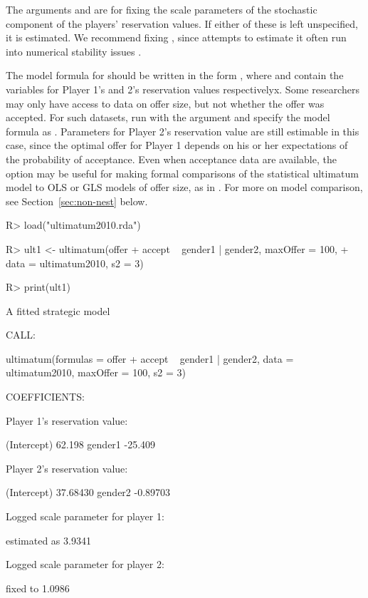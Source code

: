 \documentclass[article]{jss}
\begin{document}
The arguments  and  are for fixing the scale parameters of the
stochastic component of the players' reservation values.  If either of these is
left unspecified, it is estimated.  We recommend fixing , since
attempts to estimate it often run into numerical stability issues
\citep{Ramsay2009}.

The model formula for  should be written in the form , where  and  contain the variables for
Player 1's and 2's reservation values respectivelyx.  Some researchers may only
have access to data on offer size, but not whether the offer was accepted.  For
such datasets, run  with the argument 
and specify the model formula as .  Parameters for Player
2's reservation value are still estimable in this case, since the optimal offer
for Player 1 depends on his or her expectations of the probability of
acceptance.  Even when acceptance data are available, the option  may be useful for making formal comparisons of the statistical
ultimatum model to OLS or GLS models of offer size, as in \citet{Ramsay2009}.
For more on model comparison, see Section~\ref{sec:non-nest} below.


\begin{Schunk}
\begin{Sinput}
R> load("ultimatum2010.rda")
\end{Sinput}
\end{Schunk}
\begin{Schunk}
\begin{Sinput}
R> ult1 <- ultimatum(offer + accept ~ gender1 | gender2, maxOffer = 100, 
+     data = ultimatum2010, s2 = 3)
\end{Sinput}
\end{Schunk}
\begin{Schunk}
\begin{Sinput}
R> print(ult1)
\end{Sinput}
\begin{Soutput}
A fitted strategic model

CALL:

ultimatum(formulas = offer + accept ~ gender1 | gender2, data = ultimatum2010, 
    maxOffer = 100, s2 = 3)

COEFFICIENTS:

  Player 1's reservation value:
                        
     (Intercept)  62.198
     gender1     -25.409

  Player 2's reservation value:
                         
     (Intercept) 37.68430
     gender2     -0.89703

  Logged scale parameter for player 1:
                        
     estimated as 3.9341

  Logged scale parameter for player 2:
                    
     fixed to 1.0986
\end{Soutput}
\end{Schunk}
\end{document}
